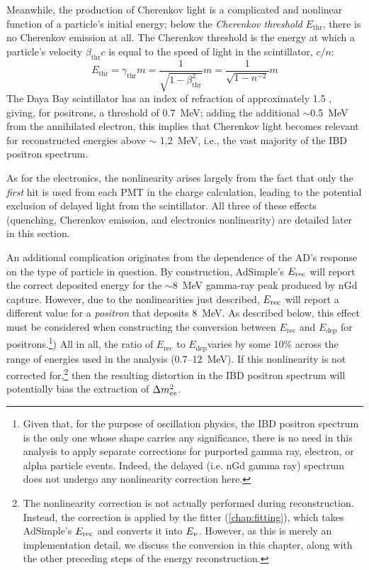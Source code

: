 \documentclass[../thesis.tex]{subfiles}
\begin{document}
Meanwhile, the production of Cherenkov light is a complicated and nonlinear function of a particle's initial energy; below the \emph{Cherenkov threshold} $E_{\mathrm{thr}}$, there is no Cherenkov emission at all. The Cherenkov threshold is the energy at which a particle's velocity $\beta_{\mathrm{thr}} c$ is equal to the speed of light in the scintillator, $c/n$:
\begin{equation}
  E_{\mathrm{thr}} = \gamma_{\mathrm{thr}} m = \frac{1}{\sqrt{1 - \beta^2_{\mathrm{thr}}}} m = \frac{1}{\sqrt{1 - n^{-2}}} m
\end{equation}
The Daya Bay scintillator has an index of refraction of approximately 1.5 \cite{Band:2012dh}, giving, for positrons, a threshold of 0.7~MeV; adding the additional $\sim$0.5~MeV from the annihilated electron, this implies that Cherenkov light becomes relevant for reconstructed energies above $\sim$ 1.2~MeV, i.e., the vast majority of the IBD positron spectrum.

As for the electronics, the nonlinearity arises largely from the fact that only the \emph{first} hit is used from each PMT in the charge calculation, leading to the potential exclusion of delayed light from the scintillator. All three of these effects (quenching, Cherenkov emission, and electronics nonlinearity) are detailed later in this section.

An additional complication originates from the dependence of the AD's response on the type of particle in question. By construction, AdSimple's $E_\mathrm{rec}$ will report the correct deposited energy for the $\sim$8~MeV gamma-ray peak produced by nGd capture. However, due to the nonlinearities just described, $E_\mathrm{rec}$ will report a different value for a \emph{positron} that deposits 8~MeV. As described below, this effect must be considered when constructing the conversion between $E_{\mathrm{rec}}$ and $E_{\mathrm{dep}}$ for positrons.\footnote{Given that, for the purpose of oscillation physics, the IBD positron spectrum is the only one whose shape carries any significance, there is no need in this analysis to apply separate corrections for purported gamma ray, electron, or alpha particle events. Indeed, the delayed (i.e. nGd gamma ray) spectrum does not undergo any nonlinearity correction here.}) All in all, the ratio of $E_{\mathrm{rec}}$ to $E_{\mathrm{dep}} $varies by some 10\% across the range of energies used in the analysis (0.7--12~MeV). If this nonlinearity is not corrected for,\footnote{The nonlinearity correction is not actually performed during reconstruction. Instead, the correction is applied by the fitter (\autoref{chap:fitting}), which takes AdSimple's $E_\mathrm{rec}$ and converts it into $E_\mathrm{\nu}$. However, as this is merely an implementation detail, we discuss the conversion in this chapter, along with the other preceding steps of the energy reconstruction.} then the resulting distortion in the IBD positron spectrum will potentially bias the extraction of $\Delta m^2_{ee}$.
\end{document}
